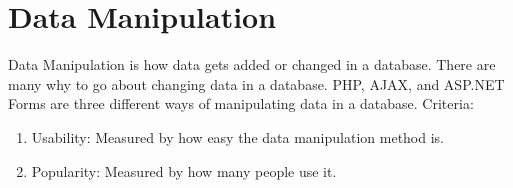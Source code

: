 \documentclass[letterpaper, 10, draftclsnofoot, onecolumn]{IEEEtran}
\begin{document}
\section*{Data Manipulation}\par
\indent Data Manipulation is how data gets added or changed in a database. There are many why to go about changing data in a database. PHP, AJAX, and ASP.NET Forms are three different ways of manipulating data in a database. 
\newline
Criteria:
\begin{enumerate}
\item Usability: Measured by how easy the data manipulation method is.
\item Popularity: Measured by how many people use it. 
\end{enumerate}
\end{document}
